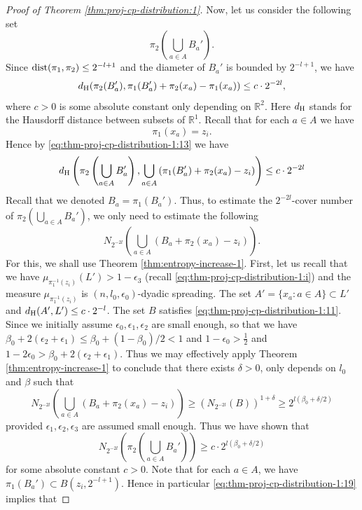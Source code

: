 \documentclass[a4paper,11pt]{amsart}
\theoremstyle{definition}
\numberwithin{equation}{section}
\def\R{\mathbb R}
\DeclareMathOperator{\dist}{{\rm dist}}
\begin{document}
\begin{proof}[Proof of Theorem \ref{thm:proj-cp-distribution:1}]
Now, let us consider the following set 
\[
\pi_2\left( \bigcup_{a\in A}B_a' \right).
\]
Since $\dist(\pi_1,\pi_2)\le 2^{-l+1}$ and the diameter of $B_a'$ is bounded by $2^{-l+1}$,  we have
\begin{equation}\label{eq:thm-proj-cp-distribution-1:13}
d_{\rm H}(\pi_2(B_a'),  \pi_1(B_a')+ \pi_2(x_a) -\pi_1(x_a)) \le  c\cdot 2^{-2l},
\end{equation}
where $c>0$ is some absolute constant only depending on $\R^2$.  Here $d_{\rm H}$ stands for the Hausdorff distance between subsets of $\R^1$. 
Recall that for each $a\in A$ we have
\begin{equation}\label{eq:thm-proj-cp-distribution-1:14}
\pi_1(x_a)=z_i.
\end{equation}
Hence by \eqref{eq:thm-proj-cp-distribution-1:13} we have
{\color{black}
\[
d_{\rm H}\left(\pi_2\left(\bigcup_{a\in A}B_a'\right),  \bigcup_{a\in A}\left(\pi_1(B_a')+ \pi_2(x_a) -z_i\right)\right)\le  c\cdot 2^{-2l}
\]}
Recall that we denoted $B_a=\pi_1(B_a')$.  Thus, to estimate the $2^{-2l}$-cover number of $\pi_2\left( \bigcup_{a\in A}B_a' \right)$, we only need to estimate the following
\[
N_{2^{-2l}}\left( \bigcup_{a\in A}(B_a+ \pi_2(x_a) -z_i) \right).
\]
For this, we shall use Theorem \ref{thm:entropy-increase-1}.   
First,  let us recall that we have $\mu_{\pi_1^{-1}(z_i)} (L')>1-\epsilon_3$ (recall  \eqref{eq:thm-proj-cp-distribution-1:i}) and the 
measure $\mu_{\pi_1^{-1}(z_i)}$ is $(n,l_0,\epsilon_0)$-dyadic spreading.
The set $A'=\{x_a:a\in A\}\subset L'$ and $d_{\rm H}(A',L')\le c\cdot 2^{-l}$.
The set $B$ satisfies \eqref{eq:thm-proj-cp-distribution-1:11}.  Since we initially assume $\epsilon_0,\epsilon_1,\epsilon_2$ are small enough, so that we have $\beta_0+2(\epsilon_2+ \epsilon_1) \le \beta_0+(1-\beta_0)/2<1$ and  $1-\epsilon_0>\frac{1}{2}$ and $1-2\epsilon_0>\beta_0+2(\epsilon_2+ \epsilon_1) $.  Thus we may effectively apply Theorem \ref{thm:entropy-increase-1} to conclude that  there exists $\delta>0$, only depends on $l_0$ and $\beta$ such that 
\[
N_{2^{-2l}}\left( \bigcup_{a\in A}(B_a+ \pi_2(x_a) -z_i) \right)\ge \left(N_{2^{-2l}}(B)\right)^{1+\delta}\ge 2^{l(\beta_0+\delta/2)}
\]
provided $\epsilon_1, \epsilon_2,  \epsilon_3$ are assumed small enough.
Thus we have shown that 
\begin{equation}\label{eq:thm-proj-cp-distribution-1:19}
N_{2^{-2l}}\left( \pi_2\left( \bigcup_{a\in A}B_a' \right) \right) \ge c\cdot 2^{l(\beta_0+\delta/2)}
\end{equation}
for some absolute constant $c>0$.  Note that for each $a\in A$,  we have $\pi_1(B_a')\subset B(z_i,2^{-l+1})$.  Hence in particular \eqref{eq:thm-proj-cp-distribution-1:19} implies that 

\end{proof}
\end{document}
